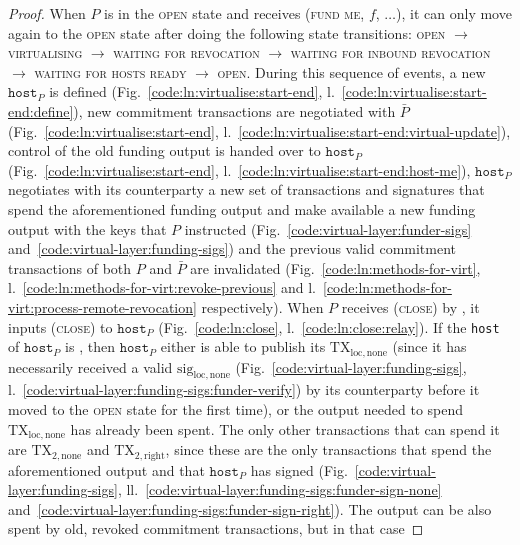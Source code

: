 \begin{proof}
  When $P$ is in the \textsc{open} state and receives (\textsc{fund me}, $f$,
  $\dots$), it can only move again to the \textsc{open} state after doing the
  following state transitions: \textsc{open} $\rightarrow$ \textsc{virtualising}
  $\rightarrow$ \textsc{waiting for revocation} $\rightarrow$ \textsc{waiting
  for inbound revocation} $\rightarrow$ \textsc{waiting for hosts ready}
  $\rightarrow$ \textsc{open}. During this sequence of events, a new
  $\texttt{host}_P$ is defined (Fig.~\ref{code:ln:virtualise:start-end},
  l.~\ref{code:ln:virtualise:start-end:define}), new commitment transactions are
  negotiated with $\bar{P}$ (Fig.~\ref{code:ln:virtualise:start-end},
  l.~\ref{code:ln:virtualise:start-end:virtual-update}), control of the old
  funding output is handed over to $\texttt{host}_P$
  (Fig.~\ref{code:ln:virtualise:start-end},
  l.~\ref{code:ln:virtualise:start-end:host-me}), $\texttt{host}_P$ negotiates
  with its counterparty a new set of transactions and signatures that spend the
  aforementioned funding output and make available a new funding output with the
  keys that $P$ instructed (Fig.~\ref{code:virtual-layer:funder-sigs}
  and~\ref{code:virtual-layer:funding-sigs}) and the previous valid commitment
  transactions of both $P$ and $\bar{P}$ are invalidated
  (Fig.~\ref{code:ln:methods-for-virt},
  l.~\ref{code:ln:methods-for-virt:revoke-previous} and
  l.~\ref{code:ln:methods-for-virt:process-remote-revocation} respectively).
  When $P$ receives (\textsc{close}) by \environment, it inputs (\textsc{close})
  to $\texttt{host}_P$ (Fig.~\ref{code:ln:close}, l.~\ref{code:ln:close:relay}).
  If the \texttt{host} of $\texttt{host}_P$ is \ledger, then $\texttt{host}_P$
  either is able to publish its $\mathrm{TX}_{\mathrm{loc}, \mathrm{none}}$
  (since it has necessarily received a valid $\mathrm{sig}_{\mathrm{loc},
  \mathrm{none}}$ (Fig.~\ref{code:virtual-layer:funding-sigs},
  l.~\ref{code:virtual-layer:funding-sigs:funder-verify}) by its counterparty
  before it moved to the \textsc{open} state for the first time), or the output
  needed to spend $\mathrm{TX}_{\mathrm{loc}, \mathrm{none}}$ has already been
  spent. The only other transactions that can spend it are $\mathrm{TX}_{2,
  \mathrm{none}}$ and $\mathrm{TX}_{2, \mathrm{right}}$, since these are the
  only transactions that spend the aforementioned output and that
  $\texttt{host}_P$ has signed (Fig.~\ref{code:virtual-layer:funding-sigs},
  ll.~\ref{code:virtual-layer:funding-sigs:funder-sign-none}
  and~\ref{code:virtual-layer:funding-sigs:funder-sign-right}). The output can
  be also spent by old, revoked commitment transactions, but in that case

\end{proof}
